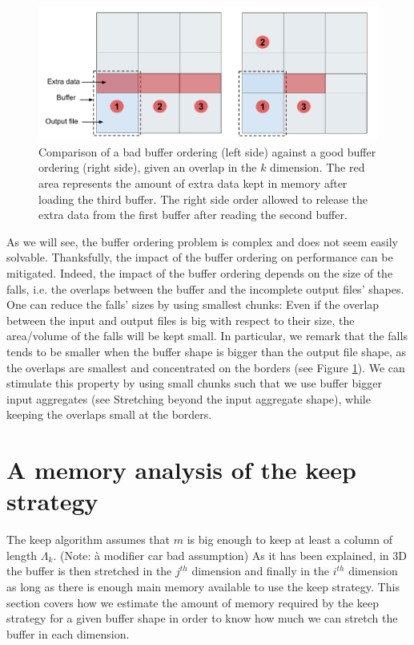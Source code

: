 \documentclass[conference]{IEEEtran}
\begin{document}
\begin{figure}[h]
\includegraphics[scale=0.2]{./figures/goodorderingbadordering.png}
\caption{ Comparison of a bad buffer ordering (left side) against a good buffer ordering (right side), given an overlap in the $k$ dimension.
The red area represents the amount of extra data kept in memory after loading the third buffer.
The right side order allowed to release the extra data from the first buffer after reading the second buffer.
}
\label{fig:goodorderingbadordering}
\end{figure}

As we will see, the buffer ordering problem is complex and does not seem easily solvable.
Thanksfully, the impact of the buffer ordering on performance can be mitigated.
Indeed, the impact of the buffer ordering depends on the size of the falls, i.e. the overlaps between the buffer and the incomplete output files' shapes.
One can reduce the falls' sizes by using smallest chunks:
Even if the overlap between the input and output files is big with respect to their size, the area/volume of the falls will be kept small.
In particular, we remark that the falls tends to be smaller when the buffer shape is bigger than the output file shape, as the overlaps are smallest and concentrated on the borders (see Figure \ref{fig:goodorderingbadordering}).
We can stimulate this property by using small chunks such that we use buffer bigger input aggregates (see Stretching beyond the input aggregate shape), while keeping the overlaps small at the borders.

\section{A memory analysis of the keep strategy}
The keep algorithm assumes that $m$ is big enough to keep at least a column of length $\Lambda_k$. (Note: à modifier car bad assumption) %
As it has been explained, in 3D the buffer is then stretched in the $j^{th}$ dimension and finally in the $i^{th}$ dimension as long as there is enough main memory available to use the keep strategy.
This section covers how we estimate the amount of memory required by the keep strategy for a given buffer shape in order to know how much we can stretch the buffer in each dimension. \\
\end{document}

